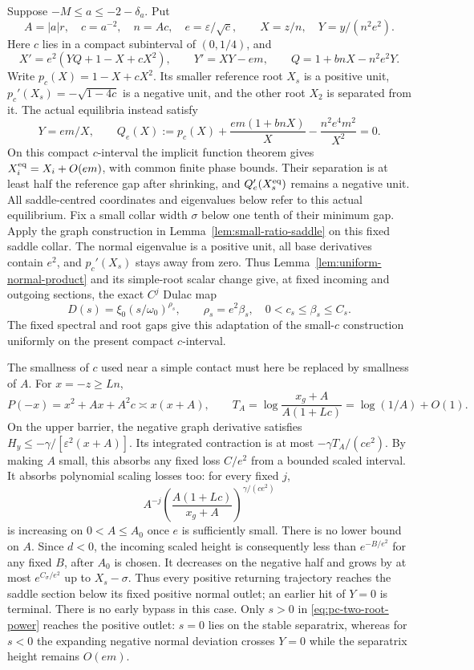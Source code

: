 Suppose $-M\le a\le-2-\delta_a$. Put
\[
 A=|a|r,\quad c=a^{-2},\quad n=Ac,\quad
 e=\varepsilon/\sqrt c,\qquad
 X=z/n,\quad Y=y/(n^2e^2).
\]
Here $c$ lies in a compact subinterval of $(0,1/4)$, and
\begin{equation}
\label{eq:pc-two-root-system}
 X'=e^2(YQ+1-X+cX^2),\qquad Y'=XY-em,\qquad
 Q=1+bnX-n^2e^2Y.
\end{equation}
Write $p_c(X)=1-X+cX^2$. Its smaller reference root $X_s$ is a positive unit,
$p_c'(X_s)=-\sqrt{1-4c}$ is a negative unit, and the other root
$X_2$ is separated from it. The actual equilibria instead satisfy
\[
 Y=em/X,\qquad
 Q_e(X):=p_c(X)+\frac{em(1+bnX)}X
                      -\frac{n^2e^4m^2}{X^2}=0.
\]
On this compact $c$-interval the implicit function theorem gives
$X_i^{\rm eq}=X_i+O(em)$, with common finite phase bounds.
Their separation is at least half the reference gap after shrinking,
and $Q_e'(X_s^{\rm eq})$ remains a negative unit. All saddle-centred
coordinates and eigenvalues below refer to this actual equilibrium.
Fix a small collar width $\sigma$ below
one tenth of their minimum gap. Apply the graph construction in
Lemma~\ref{lem:small-ratio-saddle} on this fixed saddle collar.
The normal eigenvalue is a positive unit, all base derivatives contain
$e^2$, and $p_c'(X_s)$ stays away from zero. Thus
Lemma~\ref{lem:uniform-normal-product} and its simple-root scalar
change give, at fixed incoming and outgoing sections, the exact $C^j$
Dulac map
\begin{equation}
\label{eq:pc-two-root-power}
 D(s)=\xi_0(s/\omega_0)^{\rho_s},\qquad
 \rho_s=e^2\beta_s,\quad 0<c_s\le\beta_s\le C_s.
\end{equation}
The fixed spectral and root gaps give this adaptation of the
small-$c$ construction uniformly on the present compact $c$-interval.

The smallness of $c$ used near a simple contact must here be replaced
by smallness of $A$. For $x=-z\ge Ln$,
\[
 P(-x)=x^2+Ax+A^2c\asymp x(x+A),\qquad
 T_A=\log\frac{x_g+A}{A(1+Lc)}=\log(1/A)+O(1).
\]
On the upper barrier, the negative graph derivative satisfies
$H_y\le-\gamma/[\varepsilon^2(x+A)]$. Its integrated contraction
is at most $-\gamma T_A/(ce^2)$. By making $A$ small, this absorbs
any fixed loss $C/e^2$ from a bounded scaled interval. It absorbs
polynomial scaling losses too: for every fixed $j$,
\[
 A^{-j}\left(\frac{A(1+Lc)}{x_g+A}\right)^{\gamma/(ce^2)}
\]
is increasing on $0<A\le A_0$ once $e$ is sufficiently small.
There is no lower bound on $A$.
Since $d<0$, the incoming scaled height is consequently less than
$e^{-B/e^2}$ for any fixed $B$, after $A_0$ is chosen. It decreases
on the negative half and grows by at most $e^{C_\sigma/e^2}$ up to
$X_s-\sigma$. Thus every positive returning trajectory reaches the
saddle section below its fixed positive normal outlet; an earlier
hit of $Y=0$ is terminal. There is no early bypass in this case.
Only $s>0$ in \eqref{eq:pc-two-root-power} reaches the positive
outlet: $s=0$ lies on the stable separatrix, whereas for $s<0$ the
expanding negative normal deviation crosses $Y=0$ while the
separatrix height remains $O(em)$.

